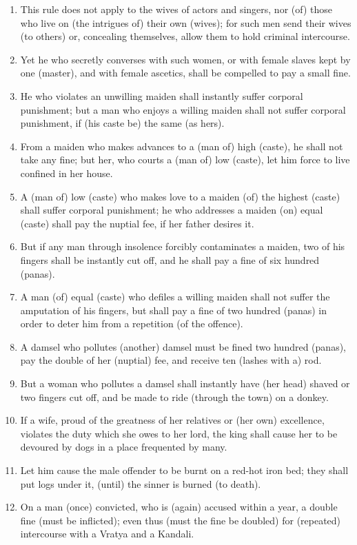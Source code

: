 \begin{enumerate}
\item This rule does not apply to the wives of actors and singers, nor (of) those who live on (the intrigues of) their own (wives); for such men send their wives (to others) or, concealing themselves, allow them to hold criminal intercourse.
\item Yet he who secretly converses with such women, or with female slaves kept by one (master), and with female ascetics, shall be compelled to pay a small fine.
\item He who violates an unwilling maiden shall instantly suffer corporal punishment; but a man who enjoys a willing maiden shall not suffer corporal punishment, if (his caste be) the same (as hers).
\item From a maiden who makes advances to a (man of) high (caste), he shall not take any fine; but her, who courts a (man of) low (caste), let him force to live confined in her house.
\item A (man of) low (caste) who makes love to a maiden (of) the highest (caste) shall suffer corporal punishment; he who addresses a maiden (on) equal (caste) shall pay the nuptial fee, if her father desires it.
\item But if any man through insolence forcibly contaminates a maiden, two of his fingers shall be instantly cut off, and he shall pay a fine of six hundred (panas).
\item A man (of) equal (caste) who defiles a willing maiden shall not suffer the amputation of his fingers, but shall pay a fine of two hundred (panas) in order to deter him from a repetition (of the offence).
\item A damsel who pollutes (another) damsel must be fined two hundred (panas), pay the double of her (nuptial) fee, and receive ten (lashes with a) rod.
\item But a woman who pollutes a damsel shall instantly have (her head) shaved or two fingers cut off, and be made to ride (through the town) on a donkey.
\item If a wife, proud of the greatness of her relatives or (her own) excellence, violates the duty which she owes to her lord, the king shall cause her to be devoured by dogs in a place frequented by many.
\item Let him cause the male offender to be burnt on a red-hot iron bed; they shall put logs under it, (until) the sinner is burned (to death).
\item On a man (once) convicted, who is (again) accused within a year, a double fine (must be inflicted); even thus (must the fine be doubled) for (repeated) intercourse with a Vratya and a Kandali.

\end{enumerate}

